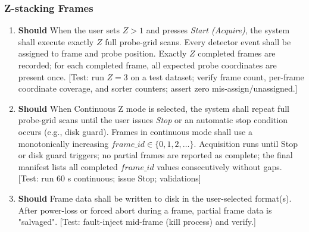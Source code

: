 \documentclass[10pt]{article}
\newcommand{\PriorityTag}[2]{%
  \colorbox{#2!25}{\footnotesize\textsf{\textbf{#1}}}\hspace{0.6em}}
\newcommand{\should}{\leavevmode\PriorityTag{Should}{yellow}}
\newcounter{reqgrp}[section] %
\newcounter{reqno}
\newcommand{\reqprefix}{GEN}
\newenvironment{requirements}[1]{%
  \renewcommand{\reqprefix}{#1}%
  \refstepcounter{reqgrp}%
  \setcounter{reqno}{0}%
  \begin{enumerate}[leftmargin=*]
}{\end{enumerate}}
\begin{document}
\subsubsection{Z-stacking Frames}
\begin{requirements}{ZST}

\item \should {}
  {When the user sets \(Z>1\) and presses \emph{Start (Acquire)}, the system shall execute exactly \(Z\) full probe-grid scans. Every detector event shall be assigned to frame and probe position. }
  {Exactly \(Z\) completed frames are recorded; for each completed frame, all expected probe coordinates are present once.}
  [Test: run \(Z=3\) on a test dataset; verify frame count, per-frame coordinate coverage, and sorter counters; assert zero mis-assign/unassigned.]

\item \should {}
  {When Continuous Z mode is selected, the system shall repeat full probe-grid scans until the user issues \emph{Stop} or an automatic stop condition occurs (e.g., disk guard). Frames in continuous mode shall use a monotonically increasing \(\textit{frame\_id}\in\{0,1,2,\dots\}\).}
  {Acquisition runs until Stop or disk guard triggers; no partial frames are reported as complete; the final manifest lists all completed \(\textit{frame\_id}\) values consecutively without gaps.}
  [Test: run 60 s continuous; issue Stop; validations]

\item \should {}
  {Frame data shall be written to disk in the user-selected format(s).}
  {After power-loss or forced abort during a frame, partial frame data is "salvaged".}
  [Test: fault-inject mid-frame (kill process) and verify.]


\end{requirements}
\end{document}
